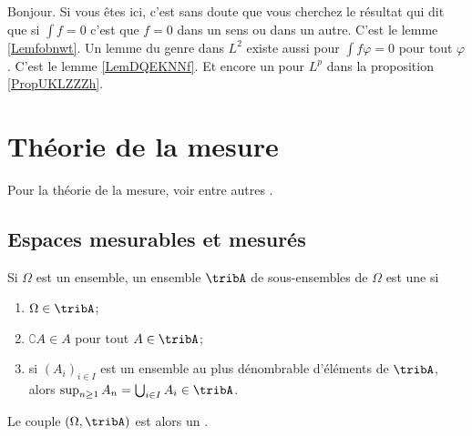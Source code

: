 
Bonjour. Si vous êtes ici, c'est sans doute que vous cherchez le résultat qui dit que si \( \int f=0\) c'est que \( f=0\) dans un sens ou dans un autre. C'est le lemme \ref{Lemfobnwt}. Un lemme du genre dans \( L^2\) existe aussi pour \( \int f\varphi=0\) pour tout \( \varphi\). C'est le lemme \ref{LemDQEKNNf}. Et encore un pour \( L^p\) dans la proposition \ref{PropUKLZZZh}.

\section{Théorie de la mesure}

Pour la théorie de la mesure, voir entre autres \cite{ProbaDanielLi}.

\subsection{Espaces mesurables et mesurés}

\begin{definition}  \label{DefjRsGSy}
    Si \( \Omega\) est un ensemble, un ensemble \( \tribA\) de sous-ensembles de \( \Omega\) est une  si 
    \begin{enumerate}
        \item
            \( \Omega\in\tribA\);
        \item
            \( \complement A\in A\) pour tout \( A\in\tribA\);
        \item
            si \( (A_i)_{i\in I}\) est un ensemble au plus dénombrable d'éléments de \( \tribA\), alors \( \sup_{n\geq 1}A_n=\bigcup_{i\in I}A_i\in\tribA\).
    \end{enumerate}
    Le couple \( (\Omega,\tribA)\) est alors un .
\end{definition}

